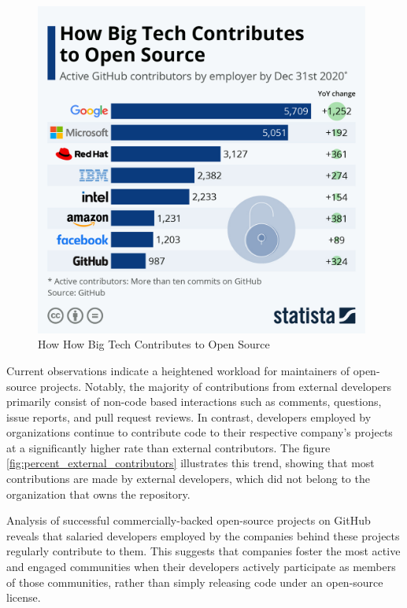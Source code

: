 \begin{figure}[ht]
    \includegraphics[width=11cm]{figs/bigtechcontributes.jpeg}
    \centering
    \caption{How How Big Tech Contributes to Open Source \cite{statista2021bigtechopensource}}
    \label{fig:bigtechcontributes}
\end{figure}


Current observations indicate a heightened workload for maintainers of open-source projects. Notably, the majority of contributions from external developers primarily consist of non-code based interactions such as comments, questions, issue reports, and pull request reviews. In contrast, developers employed by organizations continue to contribute code to their respective company's projects at a significantly higher rate than external contributors. The figure \ref{fig:percent_external_contributors} illustrates this trend, showing that most contributions are made by external developers, which did not belong to the organization that owns the repository.

Analysis of successful commercially-backed open-source projects on GitHub reveals that salaried developers employed by the companies behind these projects regularly contribute to them. This suggests that companies foster the most active and engaged communities when their developers actively participate as members of those communities, rather than simply releasing code under an open-source license.

